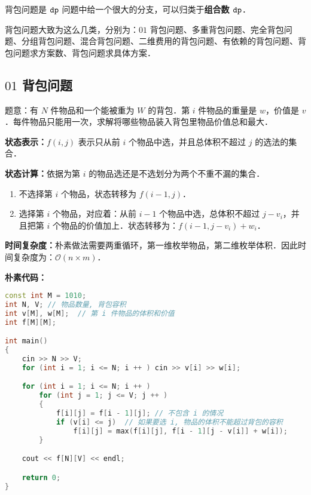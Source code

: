 
背包问题是 $\tt dp$ 问题中给一个很大的分支，可以归类于\textbf{组合数 $\tt dp$}．

背包问题大致为这么几类，分别为：$01$ 背包问题、多重背包问题、完全背包问题、分组背包问题、混合背包问题、二维费用的背包问题、有依赖的背包问题、背包问题求方案数、背包问题求具体方案．

\subsection{$01$ 背包问题}

题意：有 $N$ 件物品和一个能被重为 $W$ 的背包．第 $i$ 件物品的重量是 $w$，价值是 $v$ ．每件物品只能用一次，求解将哪些物品装入背包里物品价值总和最大．

\textbf{状态表示：}$f(i, j)$ 表示只从前 $i$ 个物品中选，并且总体积不超过 $j$ 的选法的集合．

\textbf{
状态计算：}依据为第 $i$ 的物品选还是不选划分为两个不重不漏的集合．

\begin{enumerate}
\item 不选择第 $i$ 个物品，状态转移为 $f(i - 1, j)$．
\item 选择第 $i$ 个物品，对应着：从前 $i - 1$ 个物品中选，总体积不超过 $j - v_i$，并且把第 $i$ 个物品的价值加上．状态转移为：$f(i - 1, j - v_i) + w_i$．
\end{enumerate}

\textbf{时间复杂度：}朴素做法需要两重循环，第一维枚举物品，第二维枚举体积．因此时间复杂度为：$\mathcal{O}(n \times m)$．

\textbf{朴素代码：}

\begin{lstlisting}[language=cpp]
const int M = 1010;
int N, V; // 物品数量, 背包容积
int v[M], w[M];  // 第 i 件物品的体积和价值
int f[M][M];

int main()
{
    cin >> N >> V;
    for (int i = 1; i <= N; i ++ ) cin >> v[i] >> w[i];

    for (int i = 1; i <= N; i ++ )
        for (int j = 1; j <= V; j ++ )
        {
            f[i][j] = f[i - 1][j]; // 不包含 i 的情况
            if (v[i] <= j)  // 如果要选 i, 物品的体积不能超过背包的容积
                f[i][j] = max(f[i][j], f[i - 1][j - v[i]] + w[i]);
        }

    cout << f[N][V] << endl;

    return 0;
}
\end{lstlisting}

